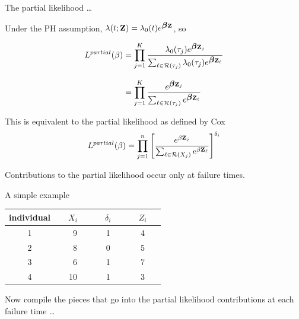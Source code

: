 \documentclass[ignorenonframetext,]{beamer}
\newcommand{\bbeta}{\mbox{\boldmath$\beta$}}
\begin{document}
\begin{frame}{%
\protect\hypertarget{the-partial-likelihood-2}{%
The partial likelihood \ldots}}

Under the PH assumption,
\(\lambda(t; {\bf Z}) = \lambda_0(t) e^{\bbeta \bf Z}\), so

\begin{align*}
 L^{partial}(\beta)  
 &= \prod_{j=1}^{K} \frac
  {  \lambda_0(\tau_j) e^{\bbeta {\bf Z}_j } }   {\sum_{\ell \in {\cal R}(\tau_j)}
        \lambda_0(\tau_j) e^{\bbeta {\bf Z}_\ell} } \\[2ex]
 &= \prod_{j=1}^{K} \frac
  {   e^{\bbeta {\bf Z}_j } }   {\sum_{\ell \in {\cal R}(\tau_j)}
        e^{\bbeta {\bf Z}_\ell} } \\
\end{align*}

This is equivalent to the partial likelihood as defined by Cox
\[L^{partial}(\beta) = \prod_{j=1}^{n} \left[\frac{e^{\beta {\bf Z}_j}}{
\sum_{\ell\in {\cal R}(X_j)} e^{\beta {\bf Z}_\ell}}\right]^{\delta_i} \]

Contributions to the partial likelihood occur only at failure times.

\end{frame}

\begin{frame}{%
\protect\hypertarget{a-simple-example}{%
A simple example}}

\begin{center}
\begin{tabular}{cccc}
\hline
individual & ~~$X_i$~~ &  ~~$\delta_i$~~ & ~~$Z_i$~~ \\ 
\hline
1  &  ~9 & 1 & 4 \\ 
2  &  ~8 & 0 & 5 \\ 
3  &  ~6 & 1 & 7 \\ 
4  &  10 & 1 & 3 \\ \hline
\end{tabular}
\end{center}

Now compile the pieces that go into the partial likelihood contributions
at each failure time \ldots

\end{frame}
\end{document}
